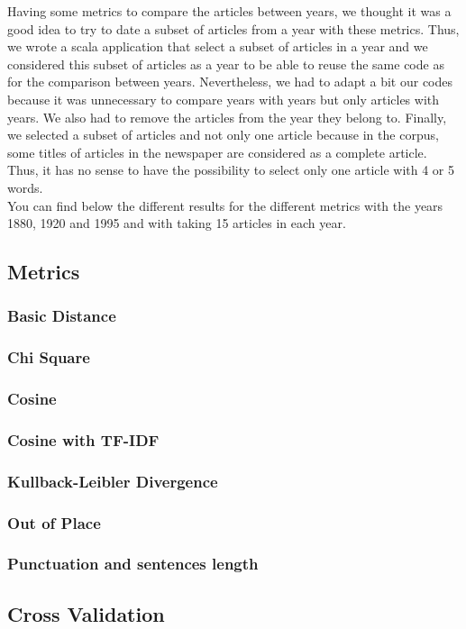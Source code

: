 Having some metrics to compare the articles between years, we thought it was a good idea to try to date a subset of articles from a year with these metrics. Thus, we wrote a scala application that select a subset of articles in a year and we considered this subset of articles as a year to be able to reuse the same code as for the comparison between years. Nevertheless, we had to adapt a bit our codes because it was unnecessary to compare years with years but only articles with years. We also had to remove the articles from the year they belong to. Finally, we selected a subset of articles and not only one article because in the corpus, some titles of articles in the newspaper are considered as a complete article. Thus, it has no sense to have the possibility to select only one article with 4 or 5 words.\\

You can find below the different results for the different metrics with the years 1880, 1920 and 1995 and with taking 15 articles in each year.

\subsection{Metrics}

\subsubsection{Basic Distance}
\subsubsection{Chi Square}
\subsubsection{Cosine}
\subsubsection{Cosine with TF-IDF}
\subsubsection{Kullback-Leibler Divergence}


\subsubsection{Out of Place}
\subsubsection{Punctuation and sentences length}


\subsection{Cross Validation}
